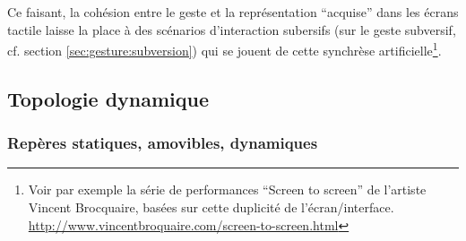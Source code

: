\indent Ce faisant, la cohésion entre le geste et la représentation ``acquise'' dans les écrans tactile laisse la place à des scénarios d'interaction subersifs (sur le geste subversif, cf. section \ref{sec:gesture:subversion}) qui se jouent de cette synchrèse artificielle\footnote{Voir par exemple la série de performances ``Screen to screen'' de l'artiste Vincent Brocquaire, basées sur cette duplicité de l'écran/interface. \url{http://www.vincentbroquaire.com/screen-to-screen.html}}.\\


\subsection{Topologie dynamique}

\subsubsection{Repères statiques, amovibles, dynamiques}

